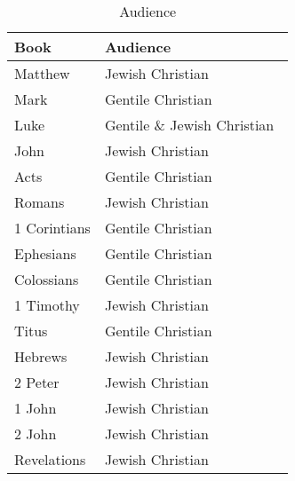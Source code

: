 \documentclass{article}
\begin{document}
\begin{table}
    \centering
    \renewcommand\arraystretch{1.3}
    \begin{tabular}{@{}ll@{}}
    \toprule
        Book & Audience \\
    \midrule
        Matthew & Jewish Christian~\cite{Saldarini2003} \\
        Mark & Gentile Christian~\cite{Schroter2010} \\
        Luke & Gentile \& Jewish Christian~\cite{Thompson2010} \\
        John & Jewish Christian \\
        Acts & Gentile Christian \\
        Romans & Jewish Christian \\
        1 Corintians & Gentile Christian \\
        Ephesians & Gentile Christian~\cite{Marshall2003} \\
        Colossians & Gentile Christian~\cite{Hooker2003} \\
        1 Timothy & Jewish Christian \\
        Titus & Gentile Christian~\cite{Perkins2003} \\
        Hebrews & Jewish Christian \\
        2 Peter & Jewish Christian \\
        1 John & Jewish Christian \\
        2 John & Jewish Christian \\
        Revelations & Jewish Christian \\
    \bottomrule
    \end{tabular}
    \caption{Audience}
    \label{audience}
\end{table}
\end{document}
